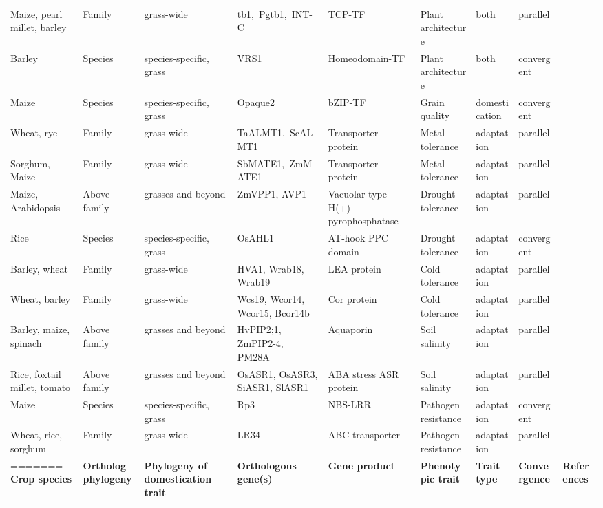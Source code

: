 \documentclass[12pt]{article}
\begin{document}
\begin{table}
\begin{center}
\begin{tabular}{G{3.5cm}G{2.5cm}C{3.10cm}C{3.5cm}C{1.95cm}G{2.0cm}G{1.8cm}G{1.5cm}G{1.5cm}}
Maize, pearl millet, barley & Family & grass-wide & tb1, Pgtb1, INT-C & TCP-TF & Plant architecture & both & parallel & \citep{Studer2011, Remigereau2011, Ramsay2011}\\
Barley & Species & species-specific, grass & VRS1 & Homeodomain-TF & Plant architecture & both & convergent & \citep{Martin2013}\\
Maize & Species & species-specific, grass & Opaque2 & bZIP-TF & Grain quality & domestication & convergent & \citep{Martin2013}\\
Wheat, rye & Family & grass-wide & TaALMT1, ScALMT1 & Transporter protein & Metal tolerance & adaptation & parallel & \citep{Martin2013}\\
Sorghum, Maize & Family & grass-wide & SbMATE1, ZmMATE1 & Transporter protein & Metal tolerance & adaptation & parallel & \citep{Martin2013}\\
Maize, Arabidopsis & Above family & grasses and beyond & ZmVPP1, AVP1 & Vacuolar-type H(+) pyrophosphatase & Drought tolerance & adaptation & parallel & \citep{Wang2016}\\
Rice & Species & species-specific, grass & OsAHL1 & AT-hook PPC domain & Drought tolerance & adaptation & convergent & \citep{Zhou2016}\\
Barley, wheat & Family & grass-wide & HVA1, Wrab18, Wrab19 & LEA protein & Cold tolerance & adaptation & parallel & \citep{Hong1988, pmid16755132}\\
Wheat, barley & Family & grass-wide & Wcs19, Wcor14, Wcor15, Bcor14b & Cor protein & Cold tolerance & adaptation & parallel & \citep{Takumi2003}\\
Barley, maize, spinach & Above family & grasses and beyond & HvPIP2;1, ZmPIP2-4, PM28A & Aquaporin & Soil salinity & adaptation & parallel & \citep{Katsuhara2002, Zhu2005, Fotiadis2000}\\
Rice, foxtail millet, tomato & Above family & grasses and beyond & OsASR1, OsASR3, SiASR1, SlASR1 & ABA stress ASR protein & Soil salinity & adaptation & parallel & \citep{Li2017, Konrad2008}\\
Maize & Species & species-specific, grass & Rp3 & NBS-LRR & Pathogen resistance & adaptation & convergent & \citep{pmid12242248}\\
Wheat, rice, sorghum & Family & grass-wide & LR34 & ABC transporter & Pathogen resistance & adaptation & parallel & \citep{Krattinger2010}\\
=======
{\bf Crop species} & {\bf Ortholog phylogeny} & {\bf Phylogeny of domestication trait} & {\bf Orthologous gene(s)} & {\bf Gene product} & {\bf Phenotypic trait} & {\bf Trait type} & {\bf Convergence} & {\bf References} \\\toprule

\end{tabular}
\end{center}
\end{table}
\end{document}
